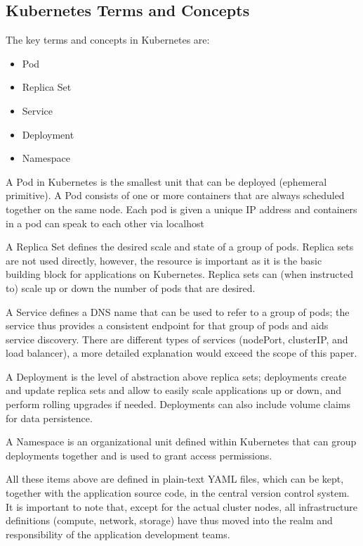 \subsection{Kubernetes Terms and Concepts}

The key terms and concepts in Kubernetes are:
\begin{itemize}
\item Pod
\item Replica Set
\item Service
\item Deployment
\item Namespace
\end{itemize}

A Pod in Kubernetes is the smallest unit that can be deployed (ephemeral primitive). A Pod consists of one or more containers that are always scheduled together on the same node. Each pod is given a unique IP address and containers in a pod can speak to each other via localhost

A Replica Set defines the desired scale and state of a group of pods. Replica sets are not used directly, however, the resource is important as it is the basic building block for applications on Kubernetes. Replica sets can (when instructed to) scale up or down the number of pods that are desired.

A Service defines a DNS name that can be used to refer to a group of pods; the service thus provides a consistent endpoint for that group of pods and aids service discovery. There are different types of services (nodePort, clusterIP, and load balancer), a more detailed explanation would exceed the scope of this paper.

A Deployment is the level of abstraction above replica sets; deployments create and update replica sets and allow to easily scale applications up or down, and perform rolling upgrades if needed. Deployments can also include volume claims for data persistence.

A Namespace is an organizational unit defined within Kubernetes that can group deployments together and is used to grant access permissions.

All these items above are defined in plain-text YAML files, which can be kept, together with the application source code, in the central version control system. It is important to note that, except for the actual cluster nodes, all infrastructure definitions (compute, network, storage) have thus moved into the realm and responsibility of the application development teams.
